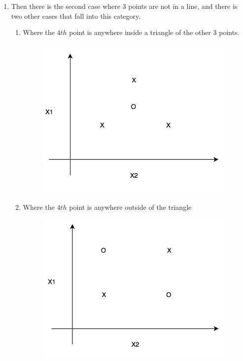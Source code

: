 \documentclass[12pt, fullpage,letterpaper]{article}
\begin{document}
\begin{enumerate}
\begin{enumerate}
    \item Then there is the second case where 3 points are not in a line, and there is two other cases that fall into
    this category.
        \begin{enumerate}
            \item Where the $4th$ point is anywhere inside a triangle of the other 3 points.
            \begin{figure}[h]
                \centering
                \includegraphics[scale=.5]{inside_triangle.png}
            \end{figure}
            \item Where the $4th$ point is anywhere outside of the triangle
            \begin{figure}[h]
                \centering
                \includegraphics[scale=.5]{not_in_triangle.png}
            \end{figure}
        \end{enumerate}
    \end{enumerate}


\end{enumerate}
\end{document}
